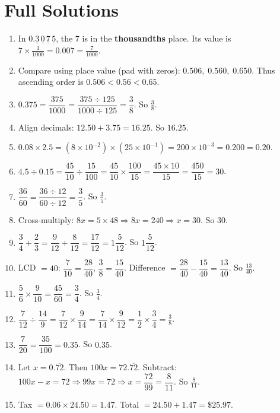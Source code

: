 \documentclass[11pt]{article}
\begin{document}
\section*{Full Solutions}
\begin{enumerate}
  \item In $0.\underline{3}\,\underline{0}\,\underline{7}\,\underline{5}$, the $7$ is in the \textbf{thousandths} place. Its value is $7\times\tfrac{1}{1000}=\boxed{0.007=\tfrac{7}{1000}}$.
  \item Compare using place value (pad with zeros): $0.506,\;0.560,\;0.650$. Thus ascending order is $\boxed{0.506<0.56<0.65}$.
  \item $0.375=\dfrac{375}{1000}=\dfrac{375\div125}{1000\div125}=\dfrac{3}{8}$. So $\boxed{\tfrac{3}{8}}$.
  \item Align decimals: $12.50+3.75=16.25$. So $\boxed{16.25}$.
  \item $0.08\times 2.5=(8\times10^{-2})\times(25\times10^{-1})=200\times10^{-3}=\boxed{0.200=0.20}$. 
  \item $4.5\div0.15=\dfrac{45}{10}\div\dfrac{15}{100}=\dfrac{45}{10}\times\dfrac{100}{15}=\dfrac{45\times10}{15}=\dfrac{450}{15}=\boxed{30}$.
  \item $\dfrac{36}{60}=\dfrac{36\div12}{60\div12}=\dfrac{3}{5}$. So $\boxed{\tfrac{3}{5}}$.
  \item Cross-multiply: $8x=5\times48\Rightarrow 8x=240\Rightarrow x=30$. So $\boxed{30}$.
  \item $\dfrac{3}{4}+\dfrac{2}{3}=\dfrac{9}{12}+\dfrac{8}{12}=\dfrac{17}{12}=1\dfrac{5}{12}$. So $\boxed{1\dfrac{5}{12}}$.
  \item LCD $=40$: $\dfrac{7}{10}=\dfrac{28}{40}$, $\dfrac{3}{8}=\dfrac{15}{40}$. Difference $=\dfrac{28}{40}-\dfrac{15}{40}=\dfrac{13}{40}$. So $\boxed{\tfrac{13}{40}}$.
  \item $\dfrac{5}{6}\times\dfrac{9}{10}=\dfrac{45}{60}=\dfrac{3}{4}$. So $\boxed{\tfrac{3}{4}}$.
  \item $\dfrac{7}{12}\div\dfrac{14}{9}=\dfrac{7}{12}\times\dfrac{9}{14}=\dfrac{7}{14}\times\dfrac{9}{12}=\dfrac{1}{2}\times\dfrac{3}{4}=\boxed{\tfrac{3}{8}}$.
  \item $\dfrac{7}{20}=\dfrac{35}{100}=0.35$. So $\boxed{0.35}$.
  \item Let $x=0.\overline{72}$. Then $100x=72.\overline{72}$. Subtract: $100x-x=72 \Rightarrow 99x=72 \Rightarrow x=\dfrac{72}{99}=\dfrac{8}{11}$. So $\boxed{\tfrac{8}{11}}$.
  \item Tax $=0.06\times 24.50=1.47$. Total $=24.50+1.47=\boxed{\$25.97}$.

\end{enumerate}
\end{document}
